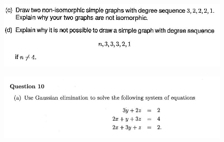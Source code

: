 \documentclass[]{article}
\begin{document}
	\newpage
	\begin{figure}[h!]
		\centering    
		\includegraphics[width=1.5\linewidth]{HC-2014-ZA-Q9part2}
	\end{figure}
	
	\newpage
	\begin{figure}[h!]
		\centering
		\includegraphics[width=1.5\linewidth]{"HC 2011 ZA Q10a"}
		\caption{}
		\label{fig:HC2011ZAQ10a}
	\end{figure}
\end{document}
